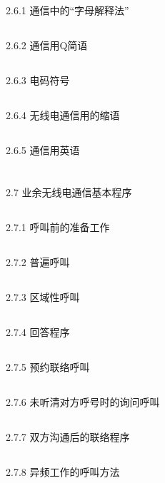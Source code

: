 \documentclass[12pt,UTF8]{ctexbook}
\begin{document}
\subsection{}2.6.1 通信中的“字母解释法”
\subsection{}2.6.2 通信用Q简语
\subsection{}2.6.3 电码符号
\subsection{}2.6.4 无线电通信用的缩语
\subsection{}2.6.5 通信用英语
\section{}2.7 业余无线电通信基本程序
\subsection{}2.7.1 呼叫前的准备工作
\subsection{}2.7.2 普遍呼叫
\subsection{}2.7.3 区域性呼叫
\subsection{}2.7.4 回答程序
\subsection{}2.7.5 预约联络呼叫
\subsection{}2.7.6 未听清对方呼号时的询问呼叫
\subsection{}2.7.7 双方沟通后的联络程序
\subsection{}2.7.8 异频工作的呼叫方法
\end{document}
